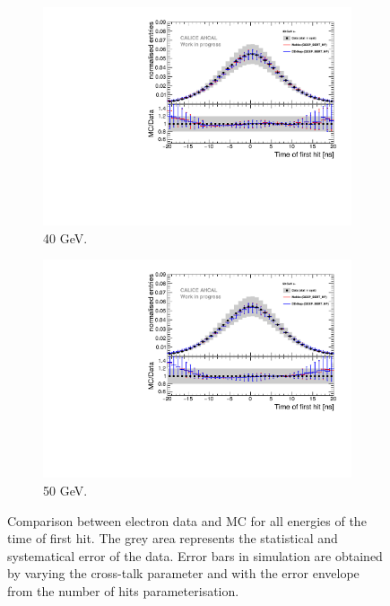 \begin{figure}[htbp!]
\begin{subfigure}[t]{0.5\textwidth}
		\includegraphics[width=1\textwidth]{chap5/fig_AHCAL_timing/Electrons/Comparison_SimData_Electrons40GeV.pdf}
		\caption{40 GeV.}\label{fig:elec_sim_data_40GeV}
	\end{subfigure}
	\hfill
	\begin{subfigure}[t]{0.5\textwidth}
		\centering
		\includegraphics[width=1\textwidth]{chap5/fig_AHCAL_timing/Electrons/Comparison_SimData_Electrons50GeV.pdf}
		\caption{50 GeV.}\label{fig:elec_sim_data_50GeV}
	\end{subfigure}
	\caption{Comparison between electron data and MC for all energies of the time of first hit. The grey area represents the statistical and systematical error of the data. Error bars in simulation are obtained by varying the cross-talk parameter and with the error envelope from the number of hits parameterisation.}
	\label{fig:sim_data_elec}
\end{figure}

